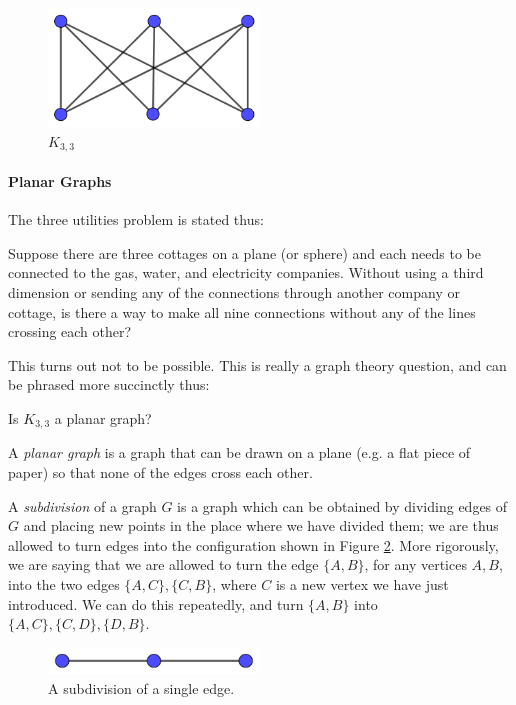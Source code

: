 \documentclass{article}
\begin{document}
	\begin{figure}[h]
		\centering
		\includegraphics[width=0.5\textwidth]{utilitygraph}
		\caption{\(K_{3,3}\)}
		\label{utilitygraph}
	\end{figure}
	
	\paragraph{Planar Graphs}
	
	The three utilities problem is stated thus:
	
	\begin{displayquote}
		Suppose there are three cottages on a plane (or sphere) and each needs to be connected to the gas, water, and electricity companies. Without using a third dimension or sending any of the connections through another company or cottage, is there a way to make all nine connections without any of the lines crossing each other?
	\end{displayquote}
	
	This turns out not to be possible. This is really a graph theory question, and can be phrased more succinctly thus:
	
	\begin{displayquote}
		Is \(K_{3,3}\) a planar graph?
	\end{displayquote}
	
	A \textit{planar graph} is a graph that can be drawn on a plane (e.g. a flat piece of paper) so that none of the edges cross each other.
	
	A \textit{subdivision} of a graph \(G\) is a graph which can be obtained by dividing edges of \(G\) and placing new points in the place where we have divided them; we are thus allowed to turn edges into the configuration shown in Figure \ref{subdivision}. More rigorously, we are saying that we are allowed to turn the edge \(\{A,B\}\), for any vertices \(A,B\), into the two edges \(\{A,C\},\{C,B\}\), where \(C\) is a new vertex we have just introduced. We can do this repeatedly, and turn \(\{A,B\}\) into \(\{A,C\},\{C,D\},\{D,B\}\).
	
	\begin{figure}[h]
		\centering
		\includegraphics[width=0.5\textwidth]{subdivision}
		\caption{A subdivision of a single edge.}
		\label{subdivision}
	\end{figure}
	
\end{document}
